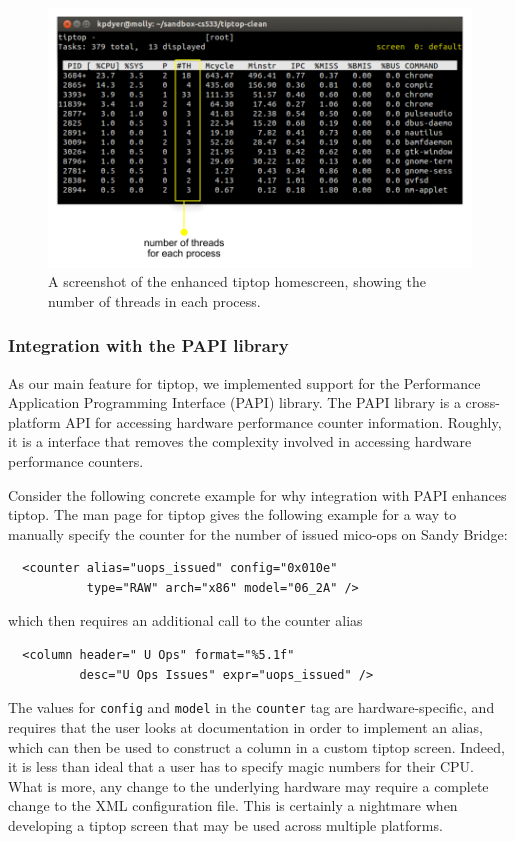 \begin{figure}[t]
\footnotesize
\centering
\includegraphics[width=.7\textwidth]{tiptop-threads}
\caption{A screenshot of the enhanced tiptop homescreen, showing the number of threads in each process.}
\label{fig:tiptop-threads}
\end{figure}

\subsubsection{Integration with the PAPI library}
As our main feature for tiptop, we implemented support for the Performance Application Programming Interface (PAPI) library.
The PAPI library is a cross-platform API for accessing hardware performance counter information.
Roughly, it is a interface that removes the complexity involved in accessing hardware performance counters.

Consider the following concrete example for why integration with PAPI enhances tiptop.
The man page for tiptop gives the following example for a way to manually specify the counter for the number of issued mico-ops on Sandy Bridge:
\begin{verbatim}
  <counter alias="uops_issued" config="0x010e"
           type="RAW" arch="x86" model="06_2A" />
\end{verbatim}
which then requires an additional call to the counter alias
\begin{verbatim}
  <column header=" U Ops" format="%5.1f"
          desc="U Ops Issues" expr="uops_issued" />
\end{verbatim}

The values for \texttt{config} and \texttt{model} in the \texttt{counter} tag are hardware-specific, and requires that the user looks at documentation in order to implement an alias, which can then be used to construct a column in a custom tiptop screen.
Indeed, it is less than ideal that a user has to specify magic numbers for their CPU.
What is more, any change to the underlying hardware may require a complete change to the XML configuration file.
This is certainly a nightmare when developing a tiptop screen that may be used across multiple platforms.

